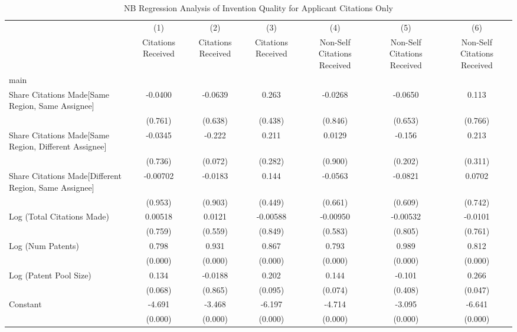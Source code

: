 \begin{table}[htbp]\centering \caption{NB Regression Analysis of Invention Quality for Applicant Citations Only \label{a.model123192021}} \begin{tabular}{l*{6}{c}} \hline\hline
                &\multicolumn{1}{c}{(1)}&\multicolumn{1}{c}{(2)}&\multicolumn{1}{c}{(3)}&\multicolumn{1}{c}{(4)}&\multicolumn{1}{c}{(5)}&\multicolumn{1}{c}{(6)}\\
                &\multicolumn{1}{c}{Citations Received}&\multicolumn{1}{c}{Citations Received}&\multicolumn{1}{c}{Citations Received}&\multicolumn{1}{c}{Non-Self Citations Received}&\multicolumn{1}{c}{Non-Self Citations Received}&\multicolumn{1}{c}{Non-Self Citations Received}\\
\hline
main            &         &         &         &         &         &         \\
Share Citations Made[Same Region, Same Assignee]&  -0.0400&  -0.0639&    0.263&  -0.0268&  -0.0650&    0.113\\
                &  (0.761)&  (0.638)&  (0.438)&  (0.846)&  (0.653)&  (0.766)\\
Share Citations Made[Same Region, Different Assignee]&  -0.0345&   -0.222&    0.211&   0.0129&   -0.156&    0.213\\
                &  (0.736)&  (0.072)&  (0.282)&  (0.900)&  (0.202)&  (0.311)\\
Share Citations Made[Different Region, Same Assignee]& -0.00702&  -0.0183&    0.144&  -0.0563&  -0.0821&   0.0702\\
                &  (0.953)&  (0.903)&  (0.449)&  (0.661)&  (0.609)&  (0.742)\\
Log (Total Citations Made)&  0.00518&   0.0121& -0.00588& -0.00950& -0.00532&  -0.0101\\
                &  (0.759)&  (0.559)&  (0.849)&  (0.583)&  (0.805)&  (0.761)\\
Log (Num Patents)&    0.798&    0.931&    0.867&    0.793&    0.989&    0.812\\
                &  (0.000)&  (0.000)&  (0.000)&  (0.000)&  (0.000)&  (0.000)\\
Log (Patent Pool Size)&    0.134&  -0.0188&    0.202&    0.144&   -0.101&    0.266\\
                &  (0.068)&  (0.865)&  (0.095)&  (0.074)&  (0.408)&  (0.047)\\
Constant        &   -4.691&   -3.468&   -6.197&   -4.714&   -3.095&   -6.641\\
                &  (0.000)&  (0.000)&  (0.000)&  (0.000)&  (0.000)&  (0.000)\\

\end{tabular}
\end{table}

